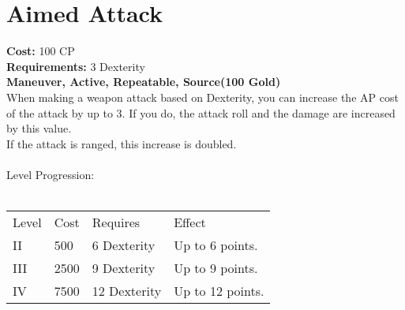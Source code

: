 \section{Aimed Attack}
\textbf{Cost:} 100 CP\\
\textbf{Requirements:} 3 Dexterity\\
\textbf{Maneuver, Active, Repeatable, Source(100 Gold)}\\
When making a weapon attack based on Dexterity, you can increase the AP cost of the attack by up to 3. If you do, the attack roll and the damage are increased by this value.\\
If the attack is ranged, this increase is doubled.\\
\\
Level Progression:\\
\\
\begin{tabular}{l | l | l | l}
	Level & Cost & Requires & Effect\\
	II & 500 & 6 Dexterity & Up to 6 points.\\
	III & 2500 & 9 Dexterity & Up to 9 points.\\
	IV & 7500 & 12 Dexterity & Up to 12 points.\\
\end{tabular}